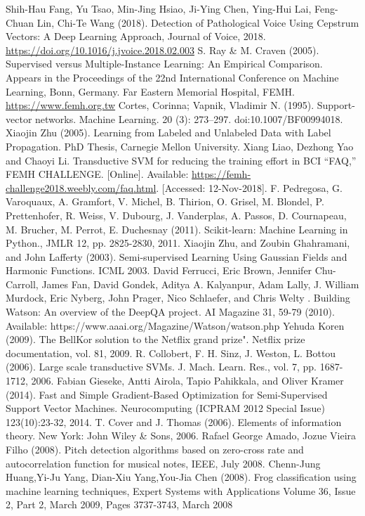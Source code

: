 \documentclass[conference]{IEEEtran}
\begin{document}
\begin{thebibliography}{00}
Shih-Hau Fang, Yu Tsao, Min-Jing Hsiao, Ji-Ying Chen, Ying-Hui Lai, Feng-Chuan Lin, Chi-Te Wang (2018).
Detection of Pathological Voice Using Cepstrum Vectors: A Deep Learning Approach,
Journal of Voice, 2018. \url{https://doi.org/10.1016/j.jvoice.2018.02.003}
S. Ray \& M. Craven (2005).
Supervised versus Multiple-Instance Learning: An Empirical Comparison.
Appears in the Proceedings of the 22nd International Conference on Machine Learning, Bonn, Germany.
Far Eastern Memorial Hospital, FEMH. \url{https://www.femh.org.tw}
Cortes, Corinna; Vapnik, Vladimir N. (1995). Support-vector networks. Machine Learning. 20 (3): 273–297. doi:10.1007/BF00994018.
Xiaojin Zhu (2005). Learning from Labeled and Unlabeled Data with Label Propagation. PhD Thesis, Carnegie Mellon University.
Xiang Liao, Dezhong Yao and Chaoyi Li. Transductive SVM for reducing the training effort in BCI
“FAQ,” FEMH CHALLENGE. [Online]. Available: \url{https://femh-challenge2018.weebly.com/faq.html}. [Accessed: 12-Nov-2018].
F. Pedregosa, G. Varoquaux, A. Gramfort, V. Michel, B. Thirion, O. Grisel, M. Blondel, P. Prettenhofer, R. Weiss, V. Dubourg, J. Vanderplas, A. Passos, D. Cournapeau, M. Brucher, M. Perrot, E. Duchesnay (2011). Scikit-learn: Machine Learning in Python., JMLR 12, pp. 2825-2830, 2011.
Xiaojin Zhu, and Zoubin Ghahramani, and John Lafferty (2003). Semi-supervised Learning Using Gaussian Fields and Harmonic Functions. ICML 2003.
David Ferrucci, Eric Brown, Jennifer Chu-Carroll, James Fan, David Gondek, Aditya A. Kalyanpur, Adam Lally, J. William Murdock, Eric Nyberg, John Prager, Nico Schlaefer, and Chris Welty . Building Watson: An overview of the DeepQA project. AI Magazine 31, 59-79 (2010). Available: https://www.aaai.org/Magazine/Watson/watson.php
Yehuda Koren (2009). The BellKor solution to the Netflix grand prize". Netflix prize documentation, vol. 81, 2009.
R. Collobert, F. H. Sinz, J. Weston, L. Bottou (2006). Large scale transductive SVMs. J. Mach. Learn. Res., vol. 7, pp. 1687-1712, 2006.
Fabian Gieseke, Antti Airola, Tapio Pahikkala, and Oliver Kramer (2014). Fast and Simple Gradient-Based Optimization for Semi-Supervised Support Vector Machines. Neurocomputing (ICPRAM 2012 Special Issue) 123(10):23-32, 2014. 
T. Cover and J. Thomas (2006). Elements of information theory. New York: John Wiley \& Sons, 2006.
Rafael George Amado, Jozue Vieira Filho (2008). Pitch detection algorithms based on zero-cross rate and autocorrelation function for musical notes, IEEE, July 2008.
Chenn-Jung Huang,Yi-Ju Yang, Dian-Xiu Yang,You-Jia Chen (2008). Frog classification using machine learning techniques, Expert Systems with Applications Volume 36, Issue 2, Part 2, March 2009, Pages 3737-3743, March 2008
\end{thebibliography}
\end{document}

